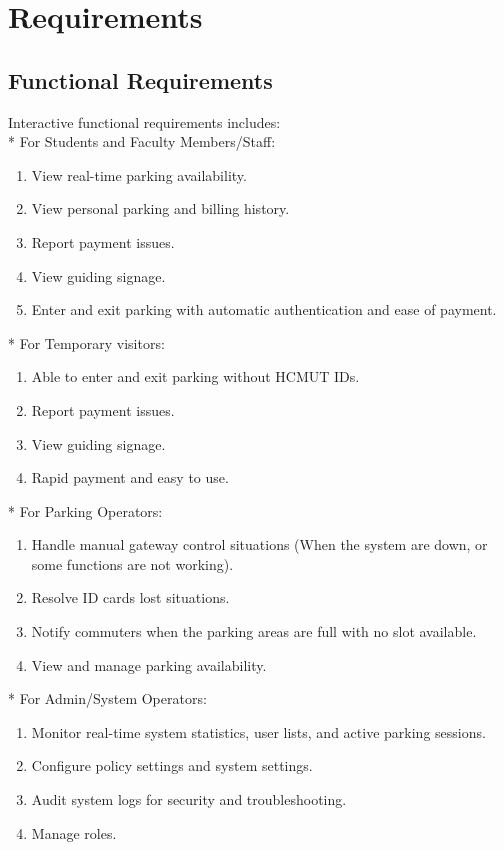 \section{Requirements}
\subsection{Functional Requirements}
Interactive functional requirements includes: \\
* For Students and Faculty Members/Staff:
\begin{enumerate}
    \item View real-time parking availability.
    \item View personal parking and billing history.
    \item Report payment issues.
    \item View guiding signage.
    \item Enter and exit parking with automatic authentication and ease of payment.
\end{enumerate}
* For Temporary visitors:
\begin{enumerate}
    \item Able to enter and exit parking without HCMUT IDs.
    \item Report payment issues.
    \item View guiding signage.
    \item Rapid payment and easy to use.
\end{enumerate}
* For Parking Operators:
\begin{enumerate}
    \item Handle manual gateway control situations (When the system are down, or some functions are not working).
    \item Resolve ID cards lost situations.
    \item Notify commuters when the parking areas are full with no slot available.
    \item View and manage parking availability.
\end{enumerate}
* For Admin/System Operators:
\begin{enumerate}
    \item Monitor real-time system statistics, user lists, and active parking sessions.
    \item Configure policy settings and system settings.
    \item Audit system logs for security and troubleshooting.
    \item Manage roles.
\end{enumerate}
